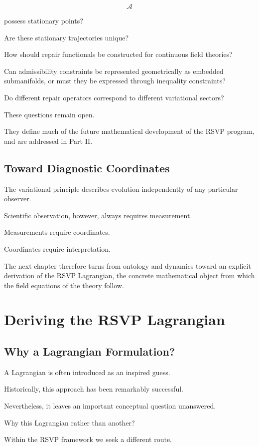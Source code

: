 \documentclass[11pt,oneside]{book}
\numberwithin{equation}{chapter}
\theoremstyle{definition}
\theoremstyle{plain}
\begin{document}
\[
\mathcal A
\]

possess stationary points?

Are these stationary trajectories unique?

How should repair functionals be constructed for continuous field theories?

Can admissibility constraints be represented geometrically as embedded
submanifolds, or must they be expressed through inequality constraints?

Do different repair operators correspond to different variational sectors?

These questions remain open.

They define much of the future mathematical development of the RSVP
program, and are addressed in Part II.

\section{Toward Diagnostic Coordinates}

The variational principle describes evolution independently of any
particular observer.

Scientific observation, however, always requires measurement.

Measurements require coordinates.

Coordinates require interpretation.

The next chapter therefore turns from ontology and dynamics toward an
explicit derivation of the RSVP Lagrangian, the concrete mathematical
object from which the field equations of the theory follow.

\chapter{Deriving the RSVP Lagrangian}

\section{Why a Lagrangian Formulation?}

A Lagrangian is often introduced as an inspired guess.

Historically, this approach has been remarkably successful.

Nevertheless, it leaves an important conceptual question unanswered.

Why this Lagrangian rather than another?

Within the RSVP framework we seek a different route.
\end{document}
